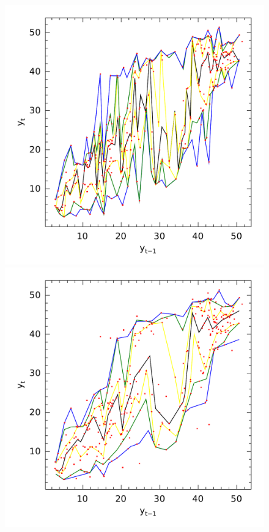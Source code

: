 \begin{figure}[htp]
  \centering
  \begin{minipage}[t]{0.4\linewidth}
    \centering
    \begin{minipage}[t]{\linewidth}
      \centering     \includegraphics[width=\textwidth]{Figuras/npqar/icaraizinho-crossing-01}
    \end{minipage}
    \begin{minipage}[b]{\linewidth}
      \centering     \includegraphics[width=\textwidth]{Figuras/npqar/icaraizinho-crossing-03}

\end{minipage}
\end{minipage}
\end{figure}
